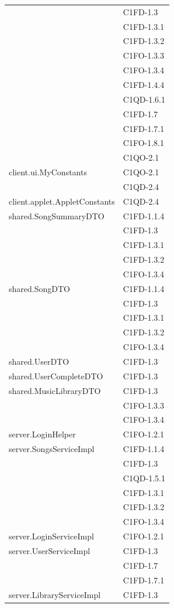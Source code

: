 \begin{footnotesize}
\begin{longtable}[!h]{|l|l|}
& C1FD-1.3\\
& C1FD-1.3.1\\ 
& C1FD-1.3.2\\
& C1FO-1.3.3\\
& C1FO-1.3.4\\
& C1FD-1.4.4\\
& C1QD-1.6.1\\
& C1FD-1.7\\
& C1FD-1.7.1\\
& C1FO-1.8.1\\
& C1QO-2.1\\\hline 
client.ui.MyConstants  &  C1QO-2.1 \\
& C1QD-2.4 \\\hline  
client.applet.AppletConstants  &  C1QD-2.4\\\hline 
shared.SongSummaryDTO  &  C1FD-1.1.4\\
& C1FD-1.3\\
& C1FD-1.3.1\\
& C1FD-1.3.2\\
& C1FO-1.3.4\\\hline
shared.SongDTO  &  C1FD-1.1.4\\
& C1FD-1.3\\
& C1FD-1.3.1\\
& C1FD-1.3.2\\
& C1FO-1.3.4\\\hline
shared.UserDTO  &  C1FD-1.3 \\\hline  
shared.UserCompleteDTO  &  C1FD-1.3 \\\hline 
shared.MusicLibraryDTO  &  C1FD-1.3\\
& C1FO-1.3.3\\
& C1FO-1.3.4\\\hline  
server.LoginHelper  &  C1FO-1.2.1 \\\hline 
server.SongsServiceImpl  &  C1FD-1.1.4\\
& C1FD-1.3\\
& C1QD-1.5.1\\
& C1FD-1.3.1\\
& C1FD-1.3.2\\
& C1FO-1.3.4\\\hline 
server.LoginServiceImpl  &  C1FO-1.2.1\\\hline 
server.UserServiceImpl  &  C1FD-1.3 \\
& C1FD-1.7\\
& C1FD-1.7.1\\\hline 
server.LibraryServiceImpl  &  C1FD-1.3\\

\end{longtable}
\end{footnotesize}
